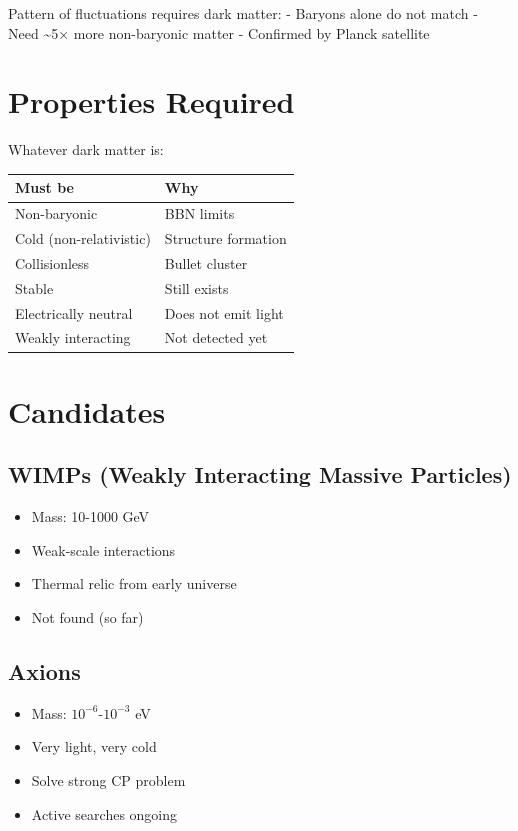 \documentclass[
  11pt,
  letterpaper,
  twoside,
  openright]{book}
\providecommand{\tightlist}{%
  \setlength{\itemsep}{0pt}\setlength{\parskip}{0pt}}
\begin{document}
Pattern of fluctuations requires dark matter: - Baryons alone do not
match - Need \textasciitilde5× more non-baryonic matter - Confirmed by
Planck satellite

\section{Properties Required}\label{properties-required}

Whatever dark matter is:

\begin{longtable}[]{@{}ll@{}}
\toprule\noalign{}
Must be & Why \\
\midrule\noalign{}
\endhead
\bottomrule\noalign{}
\endlastfoot
Non-baryonic & BBN limits \\
Cold (non-relativistic) & Structure formation \\
Collisionless & Bullet cluster \\
Stable & Still exists \\
Electrically neutral & Does not emit light \\
Weakly interacting & Not detected yet \\
\end{longtable}

\section{Candidates}\label{candidates}

\subsection{WIMPs (Weakly Interacting Massive
Particles)}\label{wimps-weakly-interacting-massive-particles}

\begin{itemize}
\tightlist
\item
  Mass: 10-1000 GeV
\item
  Weak-scale interactions
\item
  Thermal relic from early universe
\item
  Not found (so far)
\end{itemize}

\subsection{Axions}\label{axions}

\begin{itemize}
\tightlist
\item
  Mass: \(10^{-6}\)-\(10^{-3}\) eV
\item
  Very light, very cold
\item
  Solve strong CP problem
\item
  Active searches ongoing
\end{itemize}
\end{document}
